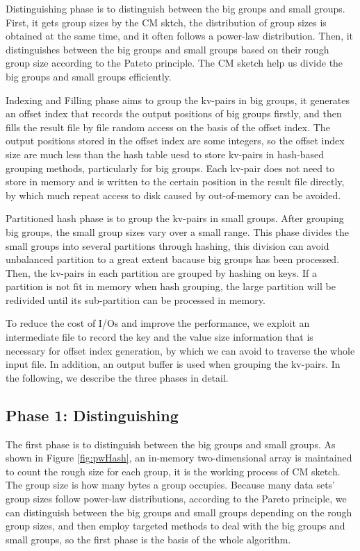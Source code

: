 Distinguishing phase is to distinguish between the big groups and small groups. First, it gets group sizes by the CM sktch, the distribution of group sizes is obtained at the same time, and it often follows a power-law distribution. Then, it distinguishes between the big groups and small groups based on their rough group size according to the Pateto principle. The CM sketch help us divide the big groups and small groups efficiently.

Indexing and Filling phase aims to group the kv-pairs in big groups, it generates an offset index that records the output positions of big groups firstly, and then fills the result file by file random access on the basis of the offset index. The output positions stored in the offset index are some integers, so the offset index size are much less than the hash table uesd to store kv-pairs in hash-based grouping methods, particularly for big groups. Each kv-pair does not need to store in memory and is written to the certain position in the result file directly, by which much repeat access to disk caused by out-of-memory can be avoided.

Partitioned hash phase is to group the kv-pairs in small groups. After grouping big groups, the small group sizes vary over a small range. This phase divides the small groups into several partitions through hashing, this division can avoid unbalanced partition to a great extent bacause big groups has been processed. Then, the kv-pairs in each partition are grouped by hashing on keys. If a partition is not fit in memory when hash grouping, the large partition will be redivided until its sub-partition can be processed in memory.

To reduce the cost of I/Os and improve the performance, we exploit an intermediate file to record the key and the value size information that is necessary for offset index generation, by which we can avoid to traverse the whole input file. In addition, an output buffer is used when grouping the kv-pairs. In the following, we describe the three phases in detail.

\subsection{Phase 1: Distinguishing}%

The first phase is to distinguish between the big groups and small groups. As shown in Figure \ref{fig:pwHash}, an in-memory two-dimensional array is maintained to count the rough size for each group, it is the working process of CM sketch. The group size is how many bytes a group occupies. Because many data sets' group sizes follow power-law distributions, according to the Pareto principle, we can distinguish between the big groups and small groups depending on the rough group sizes, and then employ targeted methods to deal with the big groups and small groups, so the first phase is the basis of the whole algorithm. 

